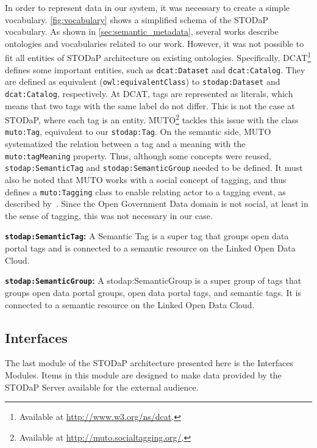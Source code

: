 In order to represent data in our system, it was necessary to create a simple vocabulary.
\autoref{fig:vocabulary} shows a simplified schema of the STODaP vocabulary.
As shown in \autoref{sec:semantic_metadata}, several works describe ontologies and vocabularies related to our work.
However, it was not possible to fit all entities of STODaP architecture on existing ontologies.
Specifically, DCAT\footnote{Available at \url{http://www.w3.org/ns/dcat}.} defines some important entities, such as \texttt{dcat:Dataset} and \texttt{dcat:Catalog}.
They are defined as equivalent (\texttt{owl:equivalentClass}) to \texttt{stodap:Dataset} and \texttt{dcat:Catalog}, respectively.
At DCAT, tags are represented as literals, which means that two tags with the same label do not differ.
This is not the case at STODaP, where each tag is an entity.
MUTO\footnote{Available at \url{http://muto.socialtagging.org/}.} tackles this issue with the class \texttt{muto:Tag}, equivalent to our \texttt{stodap:Tag}.
On the semantic side, MUTO systematized the relation between a tag and a meaning with the \texttt{muto:tagMeaning} property.
Thus, although some concepts were reused, \texttt{stodap:SemanticTag} and \texttt{stodap:SemanticGroup} needed to be defined.
It must also be noted that MUTO works with a social concept of tagging, and thus defines a \texttt{muto:Tagging} class to enable relating actor to a tagging event, as described by~.
Since the Open Government Data domain is not social, at least in the sense of tagging, this was not necessary in our case.

\noindent \textbf{\texttt{stodap:SemanticTag}:} A Semantic Tag is a super tag that groups open data portal tags and is connected to a semantic resource on the Linked Open Data Cloud.

\noindent \textbf{\texttt{stodap:SemanticGroup}:} A stodap:SemanticGroup is a super group of tags that groups open data portal groups, open data portal tags, and semantic tags. It is connected to a semantic resource on the Linked Open Data Cloud.

\subsection{Interfaces}
\label{sec:interfaces}

The last module of the STODaP architecture presented here is the Interfaces Modules.
Items in this module are designed to make data provided by the STODaP Server available for the external audience.

